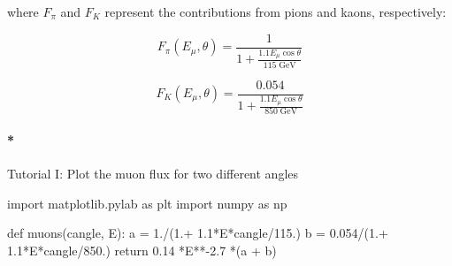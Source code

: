 \documentclass[
  letterpaper,
  DIV=11,
  numbers=noendperiod]{scrreprt}
\let\oldparagraph\paragraph
\renewcommand{\paragraph}[1]{\oldparagraph{#1}\mbox{}}
\newenvironment{Shaded}{\begin{snugshade}}{\end{snugshade}}
\newcommand{\ControlFlowTok}[1]{\textcolor[rgb]{0.00,0.23,0.31}{#1}}
\newcommand{\FloatTok}[1]{\textcolor[rgb]{0.68,0.00,0.00}{#1}}
\newcommand{\ImportTok}[1]{\textcolor[rgb]{0.00,0.46,0.62}{#1}}
\newcommand{\KeywordTok}[1]{\textcolor[rgb]{0.00,0.23,0.31}{#1}}
\newcommand{\NormalTok}[1]{\textcolor[rgb]{0.00,0.23,0.31}{#1}}
\newcommand{\OperatorTok}[1]{\textcolor[rgb]{0.37,0.37,0.37}{#1}}
\begin{document}
where \(F_\pi\) and \(F_K\) represent the contributions from pions and
kaons, respectively:

\[F_\pi(E_\mu, \theta) = \frac{1}{1+\frac{1.1 E_\mu \cos\theta}{115 \;\mathrm{GeV}}}\]

\[F_K(E_\mu, \theta) = \frac{0.054}{1+\frac{1.1 E_\mu \cos\theta}{850\;\mathrm{GeV}}}\]

\paragraph*{Tutorial I: Plot the muon flux for two different
angles}\label{tutorial-i-plot-the-muon-flux-for-two-different-angles}

\begin{Shaded}
\begin{Highlighting}[]
\ImportTok{import}\NormalTok{ matplotlib.pylab }\ImportTok{as}\NormalTok{ plt}
\ImportTok{import}\NormalTok{ numpy }\ImportTok{as}\NormalTok{ np}


\KeywordTok{def}\NormalTok{ muons(cangle, E):}
\NormalTok{    a }\OperatorTok{=} \FloatTok{1.}\OperatorTok{/}\NormalTok{(}\FloatTok{1.}\OperatorTok{+} \FloatTok{1.1}\OperatorTok{*}\NormalTok{E}\OperatorTok{*}\NormalTok{cangle}\OperatorTok{/}\FloatTok{115.}\NormalTok{)}
\NormalTok{    b }\OperatorTok{=} \FloatTok{0.054}\OperatorTok{/}\NormalTok{(}\FloatTok{1.}\OperatorTok{+} \FloatTok{1.1}\OperatorTok{*}\NormalTok{E}\OperatorTok{*}\NormalTok{cangle}\OperatorTok{/}\FloatTok{850.}\NormalTok{)}
    \ControlFlowTok{return} \FloatTok{0.14} \OperatorTok{*}\NormalTok{E}\OperatorTok{**{-}}\FloatTok{2.7} \OperatorTok{*}\NormalTok{(a }\OperatorTok{+}\NormalTok{ b)}


\end{Highlighting}
\end{Shaded}
\end{document}
